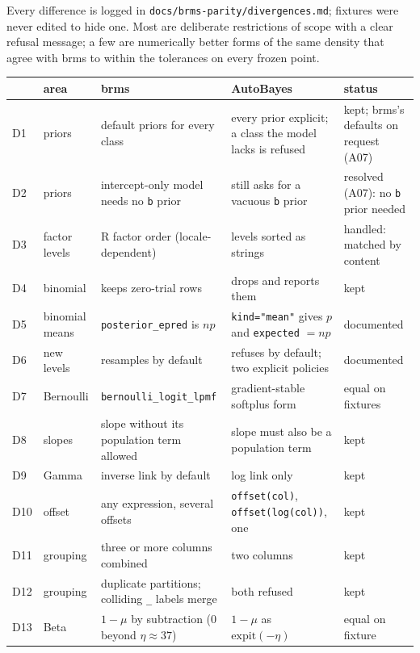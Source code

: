 \documentclass[11pt]{article}
\newcommand{\code}[1]{\texttt{#1}}
\newcommand{\file}[1]{\texttt{#1}}
\begin{document}
Every difference is logged in \file{docs/brms-parity/divergences.md}; fixtures were never edited to hide one.
Most are deliberate restrictions of scope with a clear refusal message; a few are numerically better forms of the same
density that agree with brms to within the tolerances on every frozen point.

\small
\begin{center}\begin{tabular}{@{}p{}>{\raggedright\arraybackslash}p{}>{\raggedright\arraybackslash}p{}>{\raggedright\arraybackslash}p{}>{\raggedright\arraybackslash}p{}@{}}
\toprule
& area & brms & AutoBayes & status \\
\midrule
D1 & priors & default priors for every class & every prior explicit; a class the model lacks is refused & kept; brms's defaults on request (A07) \\
D2 & priors & intercept-only model needs no \code{b} prior & still asks for a vacuous \code{b} prior & resolved (A07): no \code{b} prior needed \\
D3 & factor levels & R factor order (locale-dependent) & levels sorted as strings & handled: matched by content \\
D4 & binomial & keeps zero-trial rows & drops and reports them & kept \\
D5 & binomial means & \code{posterior\_epred} is $n p$ & \code{kind="mean"} gives $p$ and \code{expected} $= np$ & documented \\
D6 & new levels & resamples by default & refuses by default; two explicit policies & documented \\
D7 & Bernoulli & \code{bernoulli\_logit\_lpmf} & gradient-stable softplus form & equal on fixtures \\
D8 & slopes & slope without its population term allowed & slope must also be a population term & kept \\
D9 & Gamma & inverse link by default & log link only & kept \\
D10 & offset & any expression, several offsets & \code{offset(col)}, \code{offset(log(col))}, one & kept \\
D11 & grouping & three or more columns combined & two columns & kept \\
D12 & grouping & duplicate partitions; colliding \code{\_} labels merge & both refused & kept \\
D13 & Beta & $1-\mu$ by subtraction (0 beyond $\eta\approx37$) & $1-\mu$ as $\mathrm{expit}(-\eta)$ & equal on fixture \\

\end{tabular}
\end{center}
\end{document}
